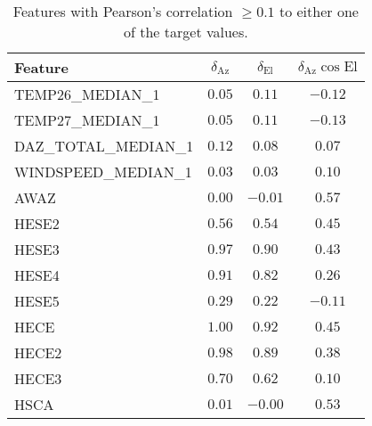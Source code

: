 \begin{table}[!htbp]
    \centering
    \caption{Features with Pearson's correlation $\geq 0.1$ to either one of the target values.}
    \begin{tabular}{lccc}
        \toprule
        Feature &  $\delta_{\text{Az}}$ &  $\delta_{\text{El}}$ &  $\delta_{\text{Az}}\cos{\text{El}}$ \\
        \midrule
        TEMP26\_MEDIAN\_1        &      $0.05$ &      $0.11$ &              $-0.12$ \\
        TEMP27\_MEDIAN\_1        &      $0.05$ &      $0.11$ &              $-0.13$ \\
        DAZ\_TOTAL\_MEDIAN\_1     &      $0.12$ &      $0.08$ &               $0.07$ \\
        WINDSPEED\_MEDIAN\_1     &      $0.03$ &      $0.03$ &               $0.10$ \\
        AWAZ                   &      $0.00$ &     $-0.01$ &               $0.57$ \\
        HESE2                  &      $0.56$ &      $0.54$ &               $0.45$ \\
        HESE3                  &      $0.97$ &      $0.90$ &               $0.43$ \\
        HESE4                  &      $0.91$ &      $0.82$ &               $0.26$ \\
        HESE5                  &      $0.29$ &      $0.22$ &              $-0.11$ \\
        HECE                   &      $1.00$ &      $0.92$ &               $0.45$ \\
        HECE2                  &      $0.98$ &      $0.89$ &               $0.38$ \\
        HECE3                  &      $0.70$ &      $0.62$ &               $0.10$ \\
        HSCA                   &      $0.01$ &     $-0.00$ &               $0.53$ \\
        \bottomrule
        \end{tabular}
    \label{tab:raw_data_pearson}
\end{table}



